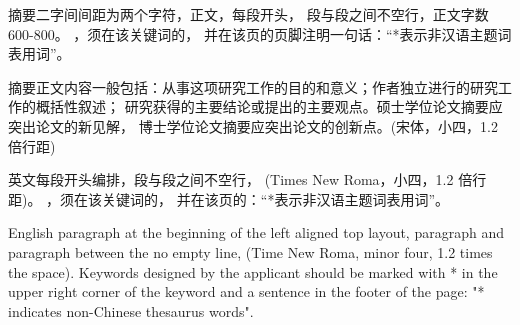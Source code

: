 \begin{zhabstract}
  摘要二字间间距为两个字符，正文，每段开头，
  段与段之间不空行，正文字数 600-800。
  ，须在该关键词的，
  并在该页的页脚注明一句话：“*表示非汉语主题词表用词”。

  摘要正文内容一般包括：从事这项研究工作的目的和意义；作者独立进行的研究工作的概括性叙述；
  研究获得的主要结论或提出的主要观点。硕士学位论文摘要应突出论文的新见解，
  博士学位论文摘要应突出论文的创新点。(宋体，小四，1.2 倍行距)
  \end{zhabstract}


\begin{enabstract}
  英文每段开头编排，段与段之间不空行，
  (Times New Roma，小四，1.2 倍行距)。
  ，须在该关键词的，
  并在该页的：“*表示非汉语主题词表用词”。

  English paragraph at the beginning of the left aligned top layout,
  paragraph and paragraph between the no empty line,
  (Time New Roma, minor four, 1.2 times the space).
  Keywords designed by the applicant should be marked with * in the upper
  right corner of the keyword and a sentence in the footer of the page:
  "* indicates non-Chinese thesaurus words".
\end{enabstract}


